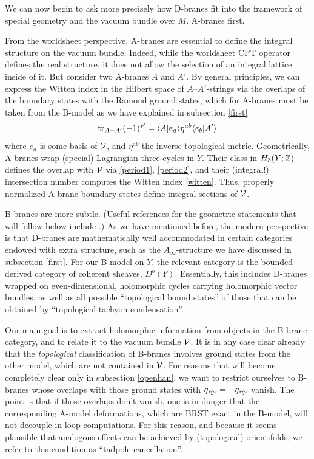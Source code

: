 We can now begin to ask more precisely how D-branes fit into 
the framework of special geometry and the vacuum bundle over $M$.
A-branes first.

From the worldsheet perspective, A-branes are essential to define 
the integral structure on the vacuum bundle. Indeed, while the 
worldsheet CPT operator defines the real structure, it does 
not allow the selection of an integral lattice inside of it. 
But consider two A-branes $A$ and $A'$. By general principles, 
we can express the Witten index in the Hilbert space of 
$A$--$A'$-strings via the overlaps of the boundary states with 
the Ramond ground states, which for A-branes must be taken from 
the B-model as we have explained in subsection \ref{first}
\begin{equation}
\eqlabel{witten}
{\rm tr}_{A-A'}(-1)^F = \langle A|e_a\rangle\eta^{ab}\langle e_b|A'\rangle
\end{equation}
where $e_a$ is some basis of ${\cal V}$, and $\eta^{ab}$ the inverse 
topological metric. Geometrically, A-branes wrap (special) Lagrangian 
three-cycles in $Y$. Their class in $H_3(Y;{\mathbb Z})$ defines the overlap
with ${\cal V}$ via \eqref{period1}, \eqref{period2}, and their 
(integral!) intersection number computes the Witten index 
\eqref{witten}. Thus, properly normalized A-brane boundary states
define integral sections of ${\cal V}$.

B-branes are more subtle. (Useful references for the geometric
statements that will follow below include \cite{cime,voisinbook}.) 
As we have mentioned before, the modern perspective is 
that D-branes are mathematically well accommodated in certain categories 
endowed with extra structure, such as the $A_\infty$-structure we have 
discussed in subsection \ref{first}. For our B-model on $Y$, the 
relevant category is the bounded derived category of coherent sheaves, 
$D^b(Y)$. Essentially, this includes D-branes wrapped on 
even-dimensional, holomorphic cycles carrying holomorphic vector
bundles, as well as all possible ``topological bound states'' of those
that can be obtained by ``topological tachyon condensation''. 

Our main goal is to extract holomorphic information from objects in 
the B-brane category, and to relate it to the vacuum bundle ${\cal V}$. 
It is in any case clear already that the {\it topological} 
classification of B-branes involves ground states 
from the other model, which are not contained in ${\cal V}$.  For 
reasons that will become completely clear only in subsection 
\ref{openhan}, we want to restrict ourselves to B-branes whose 
overlaps with those ground states with $q_{\it rgs}=
-{\bar q}_{\it rgs}$ vanish. The point is that if those overlaps don't 
vanish, one is in danger that the corresponding A-model deformations, 
which are BRST exact in the B-model, will not decouple in loop 
computations. For this reason, and because it seems plausible that 
analogous effects can be achieved by (topological) orientifolds, we 
refer to this condition as ``tadpole cancellation''. 

